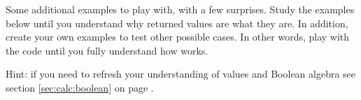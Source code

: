 \documentclass[krantz2]{krantz}\usepackage{knitr}
\begin{document}
\begin{playground}
Some additional examples to play with, with a few surprises. Study the examples below until you understand why returned values are what they are. In addition, create your own examples to test other possible cases. In other words, play with the code until you fully understand how  works.

\begin{knitrout}\footnotesize
{}\color{fgcolor}\begin{kframe}
\begin{alltt}
 \hlkwb{<-} \hlopt{:}
 \hlopt{>} \hlstd{,} \hlstd{,} \hlopt{-}\hlstd{)}
 \hlopt{>}  \hlopt{+}  \hlopt{-} \hlstd{)}
\hlstd{(} \hlopt{>}  \hlopt{+}  \hlopt{-} \hlstd{)} 
\hlstd{(}\hlstd{(} \hlopt{+}  \hlopt{-} \hlstd{)} 
\hlstd{(} \hlopt{+}  \hlopt{-} \hlstd{)} 
\end{alltt}
\end{kframe}
\end{knitrout}
Hint: if you need to refresh your understanding of  values and Boolean algebra see section \ref{sec:calc:boolean} on page \pageref{sec:calc:boolean}.
\end{playground}
\end{document}
